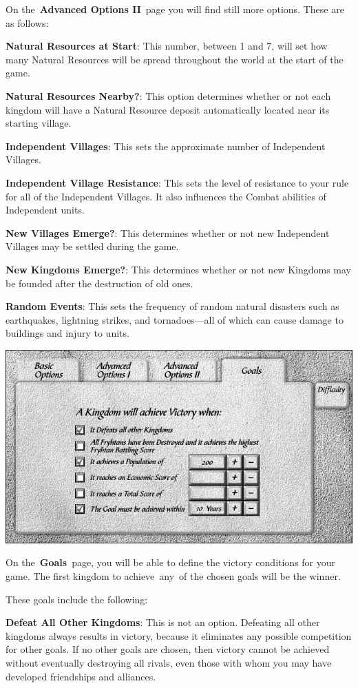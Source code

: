 On the \textbf{Advanced Options II} page you will find still more options. These are as follows:

\textbf{Natural Resources at Start}: This number, between 1 and 7, will set how many Natural Resources will be spread throughout the world at the start of the game.

\textbf{Natural Resources Nearby?}: This option determines whether or not each kingdom will have a Natural Resource deposit automatically located near its starting village.

\textbf{Independent Villages}: This sets the approximate number of Independent Villages.

\textbf{Independent Village Resistance}: This sets the level of resistance to your rule for all of the Independent Villages. It also influences the Combat abilities of Independent units.

\textbf{New Villages Emerge?}: This determines whether or not new Independent Villages may be settled during the game.

\textbf{New Kingdoms Emerge?}: This determines whether or not new Kingdoms may be founded after the destruction of old ones.

\textbf{Random Events}: This sets the frequency of random natural disasters such as earthquakes, lightning strikes, and tornadoes---all of which can cause damage to buildings and injury to units.

\begin{center}
	\includegraphics[width=0.7\linewidth]{Igoals}
\end{center}

On the \textbf{Goals} page, you will be able to define the victory conditions for your game. The first kingdom to achieve any of the chosen goals will be the winner.

These goals include the following:

\textbf{Defeat All Other Kingdoms}: This is not an option. Defeating all other kingdoms always results in victory, because it eliminates any possible competition for other goals. If no other goals are chosen, then victory cannot be achieved without eventually destroying all rivals, even those with whom you may have developed friendships and alliances.

